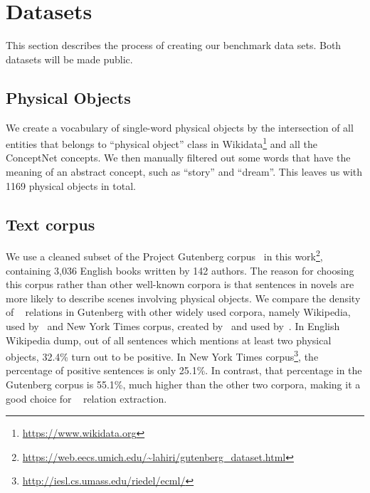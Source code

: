 \section{Datasets}
\label{sec:data}

This section describes the process of creating our benchmark data sets.
Both datasets will be made public.

\subsection{Physical Objects}
We create a vocabulary of single-word physical objects by the 
intersection of all entities that belongs to ``physical object'' class
in Wikidata\footnote{\url{https://www.wikidata.org}} and 
all the ConceptNet concepts. We then manually filtered out some 
words that have the meaning of an abstract concept, 
such as ``story'' and ``dream''. This leaves us with
1169 physical objects in total.

\subsection{Text corpus}
We use a cleaned subset of the Project Gutenberg corpus~\cite{lahiri:2014:SRW} 
in this work\footnote{\url{https://web.eecs.umich.edu/~lahiri/gutenberg_dataset.html}}, containing 3,036 English books written by 142 authors.
The reason for choosing this corpus rather than other well-known
corpora is that sentences in novels are more likely to describe scenes 
involving physical objects. 
We compare the density of \lnear~ relations in Gutenberg with other 
widely used corpora, namely Wikipedia, 
used by~\citeauthor{mintz2009distant} and New York Times corpus, 
created by~\citeauthor{riedel2010modeling} and 
used by~\citeauthor{Lin2016NeuralRE,hoffmann2011knowledge,surdeanu2012multi}. 
In English Wikipedia dump, out of all sentences which mentions at least two
physical objects, 32.4\% turn out to be positive. 
In New York Times corpus\footnote{\url{http://iesl.cs.umass.edu/riedel/ecml/}},
the percentage of positive sentences is only 25.1\%. 
In contrast, that percentage in the Gutenberg corpus is 55.1\%, much higher 
than the other two corpora, making it a good choice for \lnear~ 
relation extraction.

